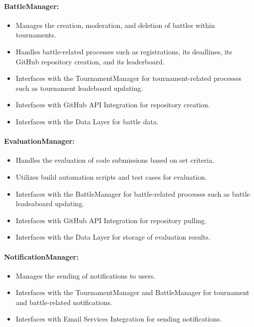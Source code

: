 \documentclass{article}
\begin{document}
\paragraph{BattleManager:}

\begin{itemize}
    \item Manages the creation, moderation, and deletion of battles within tournaments.
    \item Handles battle-related processes such as registrations, its deadlines, its GitHub 
    repository creation, and its leaderboard.
    \item Interfaces with the TournamentManager for tournament-related processes such as tournament leadeboard updating.
    \item Interfaces with GitHub API Integration for repository creation.
    \item Interfaces with the Data Layer for battle data.
\end{itemize}

\paragraph{EvaluationManager:}

\begin{itemize}
    \item Handles the evaluation of code submissions based on set criteria.
    \item Utilizes build automation scripts and test cases for evaluation.
    \item Interfaces with the BattleManager for battle-related processes such as battle leadeaboard updating.
    \item Interfaces with GitHub API Integration for repository pulling.
    \item Interfaces with the Data Layer for storage of evaluation results.
\end{itemize}

\paragraph{NotificationManager:}

\begin{itemize}
    \item Manages the sending of notifications to users.
    \item Interfaces with the TournamentManager and BattleManager for tournament and battle-related notifications.
    \item Interfaces with Email Services Integration for sending notifications.
\end{itemize}
\end{document}

